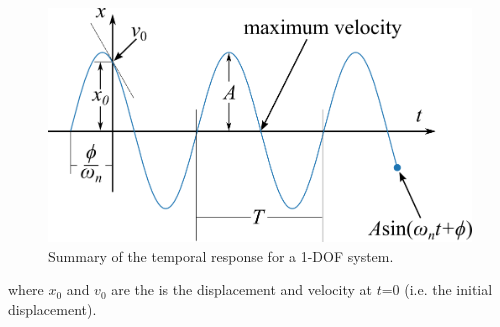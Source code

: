 \documentclass[12pt,letter]{article}
\begin{document}
\begin{figure}[H]
	\centering
	\includegraphics[]{../figures/harmonic_motion_2.png}
	\caption{Summary of the temporal response for a 1-DOF system.}
	\label{fig:Harmonic_Motion_2.png}
\end{figure}
\noindent where $x_0$ and $v_0$ are the is the displacement and velocity at $t$=0 (i.e. the initial displacement). 
\end{document}
